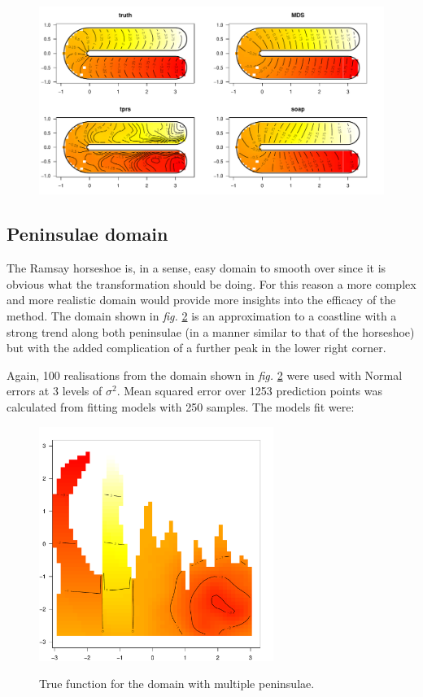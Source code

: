 \documentclass[a4paper,10pt]{article}
\newcommand{\fig}[1]{\emph{fig.} \ref{#1}}
\begin{document}
\begin{figure}
\centering
\includegraphics[width=6in]{figs/ramsay-fit-1.pdf} \\
\caption{}
\label{ramsay-fit-1}
\end{figure}

\subsection{Peninsulae domain}

The Ramsay horseshoe is, in a sense, easy domain to smooth over since it is obvious what the transformation should be doing. For this reason a more complex and more realistic domain would provide more insights into the efficacy of the method. The domain shown in \fig{wt2-truth} is an approximation to a coastline with a strong trend along both peninsulae (in a manner similar to that of the horseshoe) but with the added complication of a further peak in the lower right corner.

Again, 100 realisations from the domain shown in \fig{wt2-truth} were used with Normal errors at 3 levels of $\sigma^2$. Mean squared error over 1253 prediction points was calculated from fitting models with 250 samples. The models fit were:

\begin{figure}
\centering
\includegraphics[width=3in]{figs/wt2-truth.pdf} \\
\caption{True function for the domain with multiple peninsulae.}
\label{wt2-truth}
\end{figure}
\end{document}

